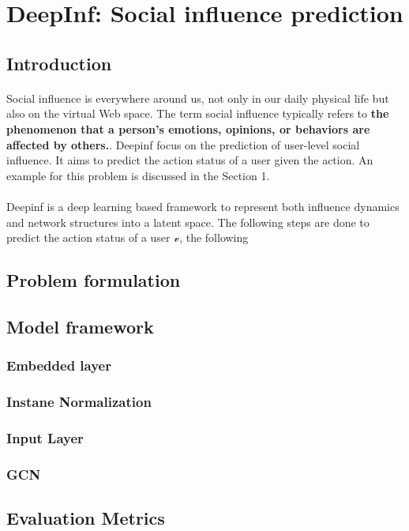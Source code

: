 \section{DeepInf: Social influence prediction}
\subsection{Introduction}
\paragraph{}Social influence is everywhere around us, not only in our daily physical life but also on the virtual Web space.
The term social influence typically refers to \textbf{the phenomenon that a person’s emotions, opinions, or behaviors are affected by others.}. 
Deepinf focus on the prediction of user-level social influence. It aims to predict the action status of a user given the action.
An example for this problem is discussed in the Section 1.
\paragraph{} Deepinf is a deep learning based framework to represent both influence dynamics and network structures into a latent space. The following 
steps are done to predict the action status of a user $\mathcal{v}$, the following 
\subsection{Problem formulation}
\subsection{Model framework}
\subsubsection{Embedded layer}
\subsubsection{Instane Normalization}
\subsubsection{Input Layer}
\subsubsection{GCN}
\subsection{Evaluation Metrics}